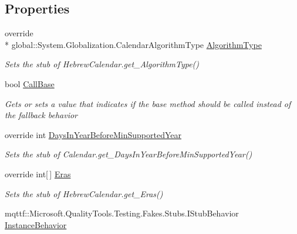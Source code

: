 \subsection*{Properties}
\begin{DoxyCompactItemize}
\item 
override \\*
global\-::\-System.\-Globalization.\-Calendar\-Algorithm\-Type \hyperlink{class_system_1_1_globalization_1_1_fakes_1_1_stub_hebrew_calendar_aa5b6cd6800dbcbfb78c6b2ccb44b49e7}{Algorithm\-Type}
\begin{DoxyCompactList}\small\item\em Sets the stub of Hebrew\-Calendar.\-get\-\_\-\-Algorithm\-Type()\end{DoxyCompactList}\item 
bool \hyperlink{class_system_1_1_globalization_1_1_fakes_1_1_stub_hebrew_calendar_afaf977b4edfe1b74e92bb1f7094f57f9}{Call\-Base}
\begin{DoxyCompactList}\small\item\em Gets or sets a value that indicates if the base method should be called instead of the fallback behavior\end{DoxyCompactList}\item 
override int \hyperlink{class_system_1_1_globalization_1_1_fakes_1_1_stub_hebrew_calendar_a3c44a112a64e129b736340237dfbe67a}{Days\-In\-Year\-Before\-Min\-Supported\-Year}
\begin{DoxyCompactList}\small\item\em Sets the stub of Calendar.\-get\-\_\-\-Days\-In\-Year\-Before\-Min\-Supported\-Year()\end{DoxyCompactList}\item 
override int\mbox{[}$\,$\mbox{]} \hyperlink{class_system_1_1_globalization_1_1_fakes_1_1_stub_hebrew_calendar_a9b64461ab67d42cdb7a6e19b447881bf}{Eras}
\begin{DoxyCompactList}\small\item\em Sets the stub of Hebrew\-Calendar.\-get\-\_\-\-Eras()\end{DoxyCompactList}\item 
mqttf\-::\-Microsoft.\-Quality\-Tools.\-Testing.\-Fakes.\-Stubs.\-I\-Stub\-Behavior \hyperlink{class_system_1_1_globalization_1_1_fakes_1_1_stub_hebrew_calendar_a8128bc95f49cd276187961793f4eaefe}{Instance\-Behavior}

\end{DoxyCompactItemize}
